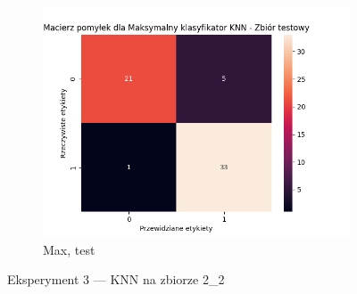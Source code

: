 \documentclass[12pt]{article}
\newcommand*{\subfigwidth}{0.24\textwidth}
\begin{document}
\begin{figure}[H]
\begin{subfigure}[t]{\subfigwidth}
        \includegraphics[width=\linewidth]{img/exp_3/knn/2_2/max/test_matrix.png}
        \caption{Max, test}
    \end{subfigure} 
    
    \caption{Eksperyment 3 --- KNN na zbiorze 2\_2}
\end{figure}
\end{document}

